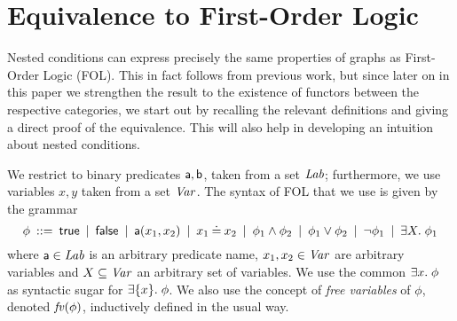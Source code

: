 \section{Equivalence to First-Order Logic}

Nested conditions can express precisely the same properties of graphs as First-Order Logic (FOL). This in fact follows from previous work, but since later on in this paper we strengthen the result to the existence of functors between the respective categories, we start out by recalling the relevant definitions and giving a direct proof of the equivalence. This will also help in developing an intuition about nested conditions.

We restrict to binary predicates $\mathsf{a},\mathsf{b}$, taken from a set $\mathit{Lab}$; furthermore, we use variables $x,y$ taken from a set $\mathit{Var}$. The syntax of FOL that we use is given by the grammar
%
\[ \phi \:::=\: \mathsf{true}
        \:\mid\: \mathsf{false}
		\:\mid\: \mathsf{a}(x_1,x_2)
        \:\mid\: x_1\mathbin{\doteq} x_2
		\:\mid\: \phi_1\wedge \phi_2
		\:\mid\: \phi_1\vee \phi_2
		\:\mid\: \neg\phi_1
		\:\mid\: \exists X.\; \phi_1 
		\]
where $\mathsf{a}\in\mathit{Lab}$ is an arbitrary predicate name, $x_1,x_2\in\mathit{Var}$ are arbitrary variables and $X\subseteq \mathit{Var}$ an arbitrary set of variables. We use the common $\exists x.\; \phi$ as syntactic sugar for $\exists\{{x}\}.\; \phi$. We also use the concept of \emph{free variables} of $\phi$, denoted $\mathit{fv}(\phi)$, inductively defined in the usual way.


